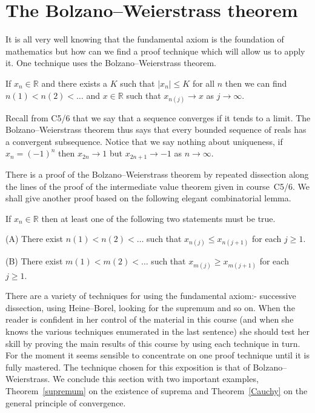 \section{The Bolzano--Weierstrass theorem} It is all very well
knowing that the fundamental axiom is the foundation
of mathematics but how can we find a proof technique
which will allow us to apply it.  One technique uses
the  Bolzano--Weierstrass theorem.
\begin{theorem}\label{one Bolzano}
If $x_{n}\in{\mathbb R}$ and there exists a $K$
such that $|x_{n}|\leq K$ for all $n$ then we can find
$n(1)<n(2)<\ldots$ and $x\in{\mathbb R}$ such that
$x_{n(j)}\rightarrow x$ as $j\rightarrow\infty$.
\end{theorem}
Recall from C5/6
that we say that a sequence converges if it tends to 
a limit.
The Bolzano--Weierstrass theorem thus
says that every bounded sequence of reals has a convergent
subsequence. Notice that we say nothing about uniqueness,
if $x_{n}=(-1)^{n}$ then $x_{2n}\rightarrow 1$ but
$x_{2n+1}\rightarrow -1$ as $n\rightarrow\infty$.

There is a proof of the Bolzano--Weierstrass theorem 
by repeated dissection along the lines of the proof
of the intermediate value theorem given in course~C5/6.
We shall give another proof based on the following
elegant combinatorial lemma.
\begin{lemma} If $x_{n}\in{\mathbb R}$ then at least
one of the following two statements must be true.

(A) There exist $n(1)<n(2)<\ldots$ such that
$x_{n(j)}\leq x_{n(j+1)}$ for each $j\geq 1$.

(B) There exist $m(1)<m(2)<\ldots$ such that
$x_{m(j)}\geq x_{m(j+1)}$ for each $j\geq 1$.
\end{lemma}

There are a variety of techniques for using the fundamental axiom:-
successive dissection, using Heine--Borel, looking for
the supremum and so on. When the reader is confident
in her control of the material in this course (and when she
knows the various techniques enumerated in
the last sentence) she should test her skill by
proving the main results of this course by using each
technique in turn. For the moment it seems sensible
to concentrate on one proof technique until
it is fully mastered. The technique chosen for this
exposition is that of Bolzano--Weierstrass.
We conclude this section with two important examples,
Theorem~\ref{supremum} on the existence of suprema
and Theorem~\ref{Cauchy} on the general principle of convergence.

